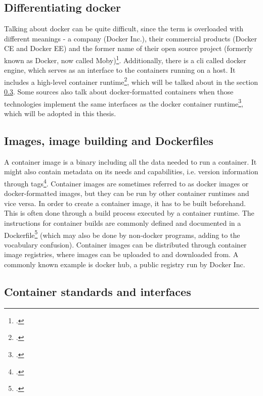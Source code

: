 \vspace{-0.5cm}
\subsection{Differentiating docker}
Talking about docker can be quite difficult, since the term is overloaded with different meanings - a company (Docker Inc.), their commercial products (Docker CE and Docker EE) and the former name of their open source project (formerly known as Docker, now called Moby)\footcite[][, section 'What is Moby?']{dockerMoby}.
Additionally, there is a \gls{cli} called docker engine, which serves as an interface to the containers running on a host. It includes a high-level container runtime\footcite[][, section 'Develop, Ship and Run Any Application, Anywhere']{dockerEngine}, which will be talked about in the section \ref{runtimes}.
Some sources also talk about docker-formatted containers when those technologies implement the same interfaces as the docker container runtime\footcite[][, section '1.11. Working with Docker formatted containers']{dockerFormatted}, which will be adopted in this thesis.
\vspace{-0.25cm}
\subsection{Images, image building and Dockerfiles}
A container image is a binary including all the data needed to run a container. It might also contain metadata on its needs and capabilities, i.e. version information through tags\footcite[][, section 'Docker Images']{redhatImages}.
Container images are sometimes referred to as docker images or docker-formatted images, but they can be run by other container runtimes and vice versa.
In order to create a container image, it has to be built beforehand. This is often done through a build process executed by a container runtime. The instructions for container builds are commonly defined and documented in a Dockerfile\footcite[][, section 'Dockerfile reference']{dockerfileDocs} (which may also be done by non-docker programs, adding to the vocabulary confusion).
Container images can be distributed through container image registries, where images can be uploaded to and downloaded from. A commonly known example is docker hub, a public registry run by Docker Inc.

\subsection{Container standards and interfaces} \label{runtimes}

